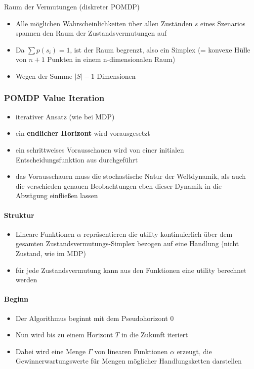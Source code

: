 Raum der Vermutungen (diskreter POMDP)
\begin{itemize}
	\item Alle m\"oglichen Wahrscheinlichkeiten \"uber allen Zust\"anden $s$ eines Szenarios spannen den Raum der Zustandsvermutungen auf
	\item Da $\sum p(s_i) = 1$, ist der Raum begrenzt, also ein Simplex (= konvexe H\"ulle von $n+1$ Punkten in einem n-dimensionalen Raum)
	\item Wegen der Summe $|S|-1$ Dimensionen
\end{itemize}

\subsubsection{POMDP Value Iteration}
\begin{itemize}
	\item iterativer Ansatz (wie bei MDP)
	\item ein \textbf{endlicher Horizont} wird vorausgesetzt
	\item ein schrittweises Vorausschauen wird von einer initialen Entscheidungsfunktion aus durchgef\"uhrt
	\item das Vorausschauen muss die stochastische Natur der Weltdynamik, als auch die verschieden genauen Beobachtungen eben dieser Dynamik in die Abw\"agung einflie{\ss}en lassen
\end{itemize}

\paragraph{Struktur}
\begin{itemize}
	\item Lineare Funktionen $\alpha$ repr\"asentieren die utility kontinuierlich \"uber dem gesamten Zustandsvermutungs-Simplex bezogen auf eine Handlung (nicht Zustand, wie im MDP)
	\item f\"ur jede Zustandsvermutung kann aus den Funktionen eine utility berechnet werden
\end{itemize}

\paragraph{Beginn}
\begin{itemize}
	\item Der Algorithmus beginnt mit dem Pseudohorizont $0$
	\item Nun wird bis zu einem Horizont $T$ in die Zukunft iteriert
	\item Dabei wird eine Menge $\Gamma$ von linearen Funktionen $\alpha$ erzeugt, die Gewinnerwartungswerte f\"ur Mengen m\"oglicher Handlungsketten darstellen
\end{itemize}

